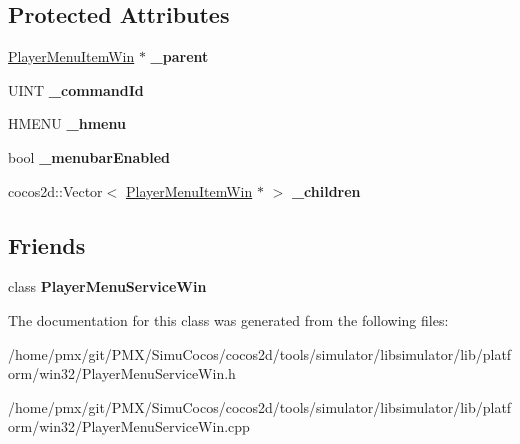 \subsection*{Protected Attributes}
\begin{DoxyCompactItemize}
\item 
\mbox{\label{classPlayerMenuItemWin_a3e2e7d6a3cd931695fe8e431176a1223}} 
\hyperlink{classPlayerMenuItemWin}{Player\+Menu\+Item\+Win} $\ast$ {\bfseries \+\_\+parent}
\item 
\mbox{\label{classPlayerMenuItemWin_a8f35780de515371a9632affd2b69abdc}} 
U\+I\+NT {\bfseries \+\_\+command\+Id}
\item 
\mbox{\label{classPlayerMenuItemWin_adc45d48dd1d8c9799462f3d307c3925d}} 
H\+M\+E\+NU {\bfseries \+\_\+hmenu}
\item 
\mbox{\label{classPlayerMenuItemWin_a598f09eb5356e0757d3966d886bd7967}} 
bool {\bfseries \+\_\+menubar\+Enabled}
\item 
\mbox{\label{classPlayerMenuItemWin_ac8396e098f6bae38257fd0c0b7cbc755}} 
cocos2d\+::\+Vector$<$ \hyperlink{classPlayerMenuItemWin}{Player\+Menu\+Item\+Win} $\ast$ $>$ {\bfseries \+\_\+children}
\end{DoxyCompactItemize}
\subsection*{Friends}
\begin{DoxyCompactItemize}
\item 
\mbox{\label{classPlayerMenuItemWin_a9e2457eb7334d27534f52003c890d31c}} 
class {\bfseries Player\+Menu\+Service\+Win}
\end{DoxyCompactItemize}


The documentation for this class was generated from the following files\+:\begin{DoxyCompactItemize}
\item 
/home/pmx/git/\+P\+M\+X/\+Simu\+Cocos/cocos2d/tools/simulator/libsimulator/lib/platform/win32/Player\+Menu\+Service\+Win.\+h\item 
/home/pmx/git/\+P\+M\+X/\+Simu\+Cocos/cocos2d/tools/simulator/libsimulator/lib/platform/win32/Player\+Menu\+Service\+Win.\+cpp\end{DoxyCompactItemize}
